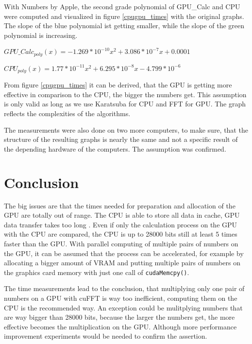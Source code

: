 \documentclass[12pt,a4paper]{article}
\begin{document}
 With Numbers by Apple, the second grade polynomial of GPU\_Calc and CPU were computed and visualized in figure \ref{cpugpu_times} with the original graphs. The slope of the blue polynomial ist getting smaller, while the slope of the green polynomial is increasing.

\begin{center}
    $GPU\_Calc_{poly}(x) = -1.269*10^{-10}x^2 + 3.086*10^{-7}x + 0.0001$
\end{center}

\begin{center}
    $CPU_{poly}(x) = 1.77*10^{-11}x^2 + 6.295*10^{-8}x - 4.799*10^{-6}$
\end{center}

From figure \ref{cpugpu_times} it can be derived, that the GPU is getting more effective in comparison to the CPU, the bigger the numbers get. This assumption is only valid as long as we use Karatsuba for CPU and FFT for GPU. The graph reflects the complexities of the algorithms.

The measurements were also done on two more computers, to make sure, that the structure of the resulting graphs is nearly the same and not a specific result of the depending hardware of the computers. The assumption was confirmed.

\section{Conclusion}
The big issues are that the times needed for preparation and allocation of the GPU are totally out of range. The CPU is able to store all data in cache, GPU data transfer takes too long \cite{cooper2011gpu}. Even if only the calculation process on the GPU with the CPU are compared, the CPU is up to 28000 bits still at least 5 times faster than the GPU. With parallel computing of multiple pairs of numbers on the GPU, it can be assumed that the process can be accelerated, for example by allocating a bigger amount of VRAM and putting multiple pairs of numbers on the graphics card memory with just one call of \texttt{cudaMemcpy()}.

The time measurements lead to the conclusion, that multiplying only one pair of numbers on a GPU with cuFFT is way too inefficient, computing them on the CPU is the recommended way. An exception could be mulitplying numbers that are way bigger than 28000 bits, because the larger the numbers get, the more effective becomes the multiplication on the GPU. Although more performance improvement experiments would be needed to confirm the assertion.


\end{document}

